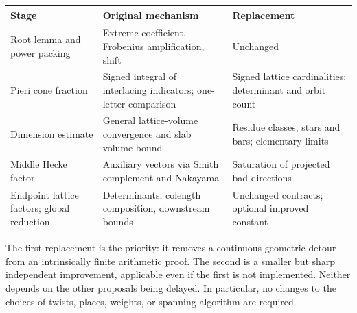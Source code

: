 \documentclass[11pt]{article}
\theoremstyle{remark}\newtheorem{remark}[theorem]{Remark}
\begin{document}
\begin{center}\small
\begin{tabular}{p{.30\linewidth}p{.31\linewidth}p{.28\linewidth}}
\toprule
Stage & Original mechanism & Replacement \\
\midrule
Root lemma and power packing & Extreme coefficient, Frobenius amplification, shift & Unchanged \\
Pieri cone fraction & Signed integral of interlacing indicators; one-letter comparison & Signed lattice cardinalities; determinant and orbit count \\
Dimension estimate & General lattice-volume convergence and slab volume bound & Residue classes, stars and bars; elementary limits \\
Middle Hecke factor & Auxiliary vectors via Smith complement and Nakayama & Saturation of projected bad directions \\
Endpoint lattice factors; global reduction & Determinants, colength composition, downstream bounds & Unchanged contracts; optional improved constant \\
\bottomrule
\end{tabular}
\end{center}

The first replacement is the priority: it removes a continuous-geometric detour from an intrinsically finite arithmetic proof. The second is a smaller but sharp independent improvement, applicable even if the first is not implemented. Neither depends on the other proposals being delayed. In particular, no changes to the choices of twists, places, weights, or spanning algorithm are required.
\end{document}
